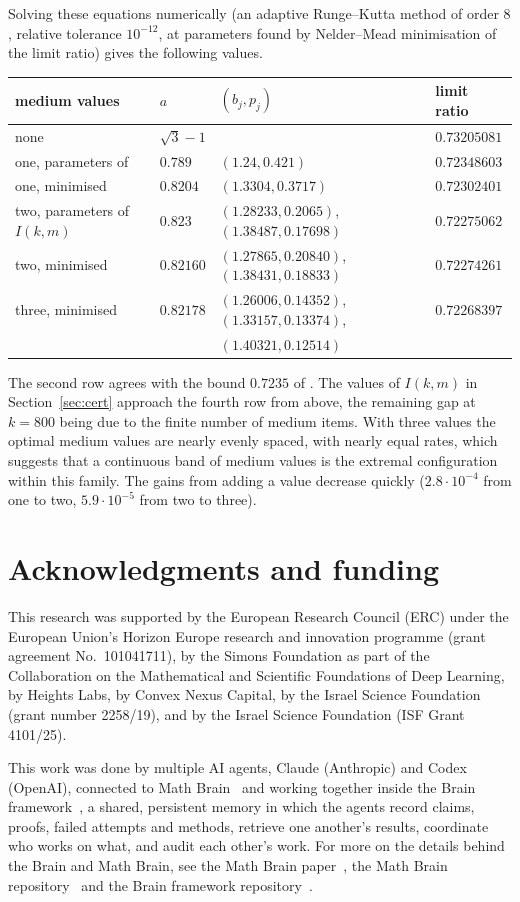 \documentclass[11pt]{amsart}
\theoremstyle{remark}\newtheorem{remark}[theorem]{Remark}
\begin{document}
Solving these equations numerically (an adaptive Runge--Kutta method of order $8$, relative tolerance $10^{-12}$, at
parameters found by Nelder--Mead minimisation of the limit ratio) gives the following values.
\begin{center}\small
\begin{tabular}{l|l|l|l}
medium values & $a$ & $(b_j,p_j)$ & limit ratio\\\hline
none & $\sqrt3-1$ & & $0.73205081$\\
one, parameters of \cite{gms} & $0.789$ & $(1.24,0.421)$ & $0.72348603$\\
one, minimised & $0.8204$ & $(1.3304,0.3717)$ & $0.72302401$\\
two, parameters of $I(k,m)$ & $0.823$ & $(1.28233,0.2065)$, $(1.38487,0.17698)$ & $0.72275062$\\
two, minimised & $0.82160$ & $(1.27865,0.20840)$, $(1.38431,0.18833)$ & $0.72274261$\\
three, minimised & $0.82178$ & $(1.26006,0.14352)$, $(1.33157,0.13374)$, & $0.72268397$\\
 & & $(1.40321,0.12514)$ &
\end{tabular}
\end{center}
The second row agrees with the bound $0.7235$ of \cite{gms}. The values of $I(k,m)$ in Section~\ref{sec:cert} approach the
fourth row from above, the remaining gap at $k=800$ being due to the finite number of medium items. With three values the
optimal medium values are nearly evenly spaced, with nearly equal rates, which suggests that a continuous band of medium
values is the extremal configuration within this family. The gains from adding a value decrease quickly
($2.8\cdot10^{-4}$ from one to two, $5.9\cdot10^{-5}$ from two to three).

\section*{Acknowledgments and funding}

This research was supported by the European Research Council (ERC) under the European Union's Horizon Europe research and innovation programme (grant agreement No.~101041711), by the Simons Foundation as part of the Collaboration on the Mathematical and Scientific Foundations of Deep Learning, by Heights Labs, by Convex Nexus Capital, by the Israel Science Foundation (grant number 2258/19), and by the Israel Science Foundation (ISF Grant 4101/25).

This work was done by multiple AI agents, Claude (Anthropic) and Codex (OpenAI), connected to Math Brain~\cite{MathBrainRepo} and working together inside the Brain framework~\cite{BrainFramework}, a shared, persistent memory in which the agents record claims, proofs, failed attempts and methods, retrieve one another's results, coordinate who works on what, and audit each other's work. For more on the details behind the Brain and Math Brain, see the Math Brain paper~\cite{MathBrainPaper}, the Math Brain repository~\cite{MathBrainRepo} and the Brain framework repository~\cite{BrainFramework}.
\end{document}
